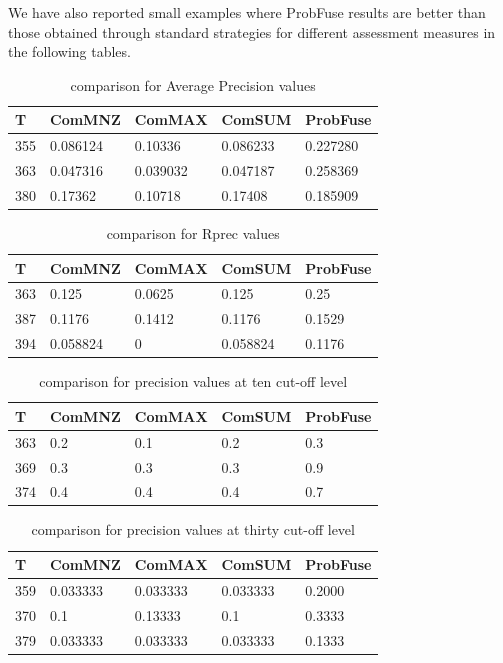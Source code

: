 \documentclass[12pt,journal]{IEEEtran}
\begin{document}
We have also reported small examples where ProbFuse results are better than those obtained through standard strategies for different assessment measures in the following tables. \\


\begin{table}[h!]
\centering
\caption{comparison for Average Precision values}
\begin{tabular}{|l|l|l|l|l|}
\hline
T   & ComMNZ    & ComMAX   & ComSUM    & ProbFuse \\ \hline
355 & 0.086124  & 0.10336  & 0.086233  & 0.227280 \\ \hline
363 & 0.047316  & 0.039032 & 0.047187  & 0.258369  \\ \hline
380 & 0.17362   & 0.10718  & 0.17408   & 0.185909  \\ \hline
\end{tabular}
\end{table}

\begin{table}[h!]
\centering
\caption{comparison for Rprec values}
\begin{tabular}{|l|l|l|l|l|}
\hline
T   & ComMNZ   & ComMAX  & ComSUM   & ProbFuse \\ \hline
363 & 0.125    & 0.0625  & 0.125    & 0.25     \\ \hline
387 & 0.1176  & 0.1412 & 0.1176  & 0.1529  \\ \hline
394 & 0.058824 & 0       & 0.058824 & 0.1176  \\  \hline
\end{tabular} 
\end{table}


\begin{table}[h!]
\centering
\caption{comparison for precision values at ten cut-off level}
\begin{tabular}{|l|l|l|l|l|}
\hline
T   & ComMNZ & ComMAX & ComSUM & ProbFuse \\ \hline
363 & 0.2    & 0.1    & 0.2    & 0.3     \\ \hline
369 & 0.3    & 0.3    & 0.3    & 0.9     \\ \hline
374 & 0.4    & 0.4    & 0.4    & 0.7      \\ \hline
\end{tabular}
\end{table}

\begin{table}[h!]
\centering
\caption{comparison for precision values at thirty cut-off level}
\begin{tabular}{|l|l|l|l|l|}
\hline
T   & ComMNZ   & ComMAX   & ComSUM   & ProbFuse \\ \hline
359 & 0.033333 & 0.033333 & 0.033333 & 0.2000  \\ \hline
370 & 0.1      & 0.13333  & 0.1      & 0.3333  \\ \hline
379 & 0.033333 & 0.033333 & 0.033333 & 0.1333     \\ \hline
\end{tabular}
\end{table}
\end{document}

